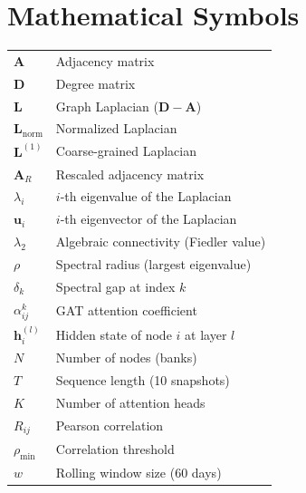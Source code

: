 \documentclass[11pt,a4paper]{report}
\begin{document}
\section*{Mathematical Symbols}
\vspace{-0.5em}
\begin{longtable}{@{}p{2.2cm}p{10cm}@{}}
$\mathbf{A}$ & Adjacency matrix \\
$\mathbf{D}$ & Degree matrix \\
$\mathbf{L}$ & Graph Laplacian ($\mathbf{D} - \mathbf{A}$) \\
$\mathbf{L}_{\text{norm}}$ & Normalized Laplacian \\
$\mathbf{L}^{(1)}$ & Coarse-grained Laplacian \\
$\mathbf{A}_R$ & Rescaled adjacency matrix \\
$\lambda_i$ & $i$-th eigenvalue of the Laplacian \\
$\mathbf{u}_i$ & $i$-th eigenvector of the Laplacian \\
$\lambda_2$ & Algebraic connectivity (Fiedler value) \\
$\rho$ & Spectral radius (largest eigenvalue) \\
$\delta_k$ & Spectral gap at index $k$ \\
$\alpha_{ij}^k$ & GAT attention coefficient \\
$\mathbf{h}_i^{(l)}$ & Hidden state of node $i$ at layer $l$ \\
$N$ & Number of nodes (banks) \\
$T$ & Sequence length (10 snapshots) \\
$K$ & Number of attention heads \\
$R_{ij}$ & Pearson correlation \\
$\rho_{\min}$ & Correlation threshold \\
$w$ & Rolling window size (60 days) \\
\end{longtable}









\end{document}
